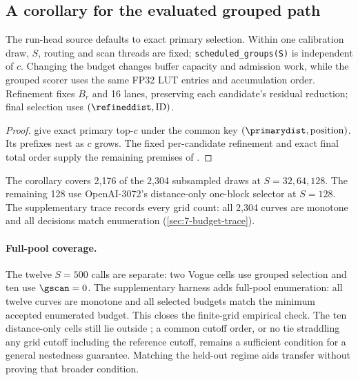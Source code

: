 \subsection{A corollary for the evaluated grouped path}

The run-head source defaults to exact primary selection. Within one
calibration draw, $S$, routing and scan threads are fixed;
\texttt{scheduled\_groups(S)} is independent of $c$. Changing the budget
changes buffer capacity and admission work, while the grouped scorer
uses the same FP32 LUT entries and accumulation order. Refinement fixes
$B_r$ and 16 lanes, preserving each candidate's residual reduction;
final selection uses $(\refineddist,\mathrm{ID})$.

\par\noindent\begin{minipage}{\linewidth}
\begin{proof}
 give exact
primary top-$c$ under the common key $(\primarydist,\mathrm{position})$.
Its prefixes nest as $c$ grows. The fixed per-candidate refinement and
exact final total order supply the remaining premises of
.
\end{proof}
\end{minipage}\par\medskip

The corollary covers 2,176 of the 2,304 subsampled draws at
$S=32,64,128$. The remaining 128 use OpenAI-3072's distance-only
one-block selector at $S=128$. The supplementary trace records every
grid count: all 2,304 curves are monotone and all decisions match
enumeration (\cref{sec:7-budget-trace}).

\paragraph{Full-pool coverage.}
The twelve $S=500$ calls are separate: two Vogue cells use grouped
selection and ten use $\gscan=0$. The supplementary harness adds full-pool
enumeration: all twelve curves are monotone and all selected budgets
match the minimum accepted enumerated budget. This closes the finite-grid
empirical check. The ten distance-only cells still lie outside
; a common cutoff order, or no tie
straddling any grid cutoff including the reference cutoff, remains a
sufficient condition for a general nestedness guarantee. Matching the
held-out regime aids transfer without proving that broader condition.

